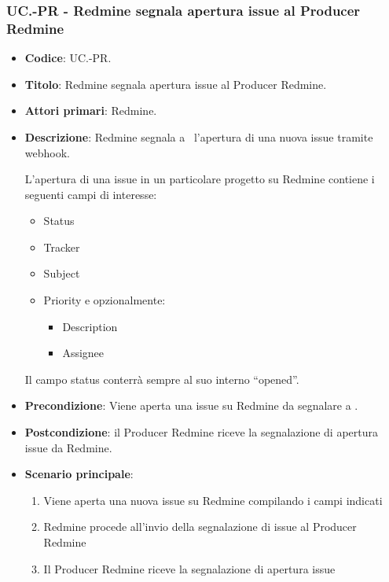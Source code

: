 \subsubsection{UC\theuccount.\thesubuccount-PR - Redmine segnala apertura issue al Producer Redmine}
\begin{itemize}
	\item \textbf{Codice}: UC\theuccount.\thesubuccount-PR.
	\item \textbf{Titolo}: Redmine segnala apertura issue al Producer Redmine.
	\item \textbf{Attori primari}: Redmine.
	\item \textbf{Descrizione}: Redmine segnala a \progetto\ l'apertura di una nuova issue tramite webhook.

	L'apertura di una issue in un particolare progetto su Redmine contiene i seguenti campi di interesse:
	\begin{itemize}
		\item Status
		\item Tracker
		\item Subject
		\item Priority e opzionalmente:
		\begin{itemize}
			\item Description
			\item Assignee
		\end{itemize}
	\end{itemize}
	Il campo status conterrà sempre al suo interno ``opened''.
	\item \textbf{Precondizione}: Viene aperta una issue su Redmine da
	segnalare a \progetto.
	\item \textbf{Postcondizione}: il Producer Redmine riceve la segnalazione di apertura issue da Redmine.
	\item \textbf{Scenario principale}:
	\begin{enumerate}
		\item Viene aperta una nuova issue su Redmine compilando i campi indicati
		\item Redmine procede all'invio della segnalazione di issue al Producer Redmine
        \item Il Producer Redmine riceve la segnalazione di apertura issue
	\end{enumerate}

\end{itemize}


